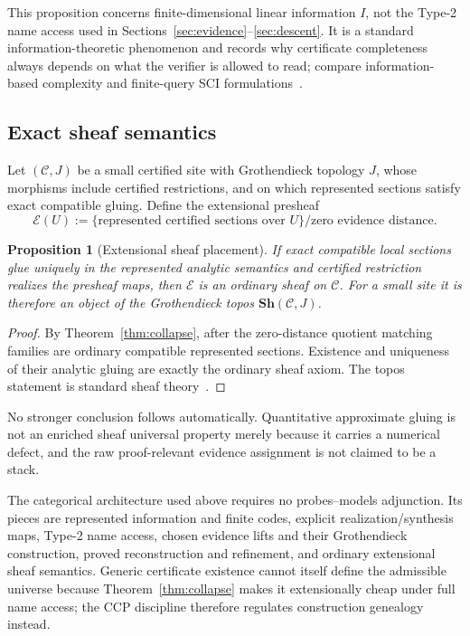 \documentclass[11pt]{article}
\newtheorem{proposition}[theorem]{Proposition}
\theoremstyle{definition}
\begin{document}
This proposition concerns finite-dimensional linear information $I$, not the Type-2 name
access used in Sections~\ref{sec:evidence}--\ref{sec:descent}.  It is a standard
information-theoretic phenomenon and records why
certificate completeness always depends on what the verifier is allowed to read; compare
information-based complexity and finite-query SCI formulations~\cite{TWW,ColbrookHansen,Sorg2026}.

\subsection{Exact sheaf semantics}

Let $(\mathcal C,J)$ be a small certified site with Grothendieck topology $J$, whose
morphisms include certified restrictions, and on which represented sections satisfy exact
compatible gluing.  Define the extensional presheaf
\[
 \mathcal E(U):=\{\text{represented certified sections over }U\}/\text{zero evidence distance}.
\]

\begin{proposition}[Extensional sheaf placement]\label{prop:sheaf}
If exact compatible local sections glue uniquely in the represented analytic semantics and
certified restriction realizes the presheaf maps, then $\mathcal E$ is an ordinary sheaf
on $\mathcal C$.  For a small site it is therefore an object of the Grothendieck topos
$\mathbf{Sh}(\mathcal C,J)$.
\end{proposition}

\begin{proof}
By Theorem~\ref{thm:collapse}, after the zero-distance quotient matching families are
ordinary compatible represented sections.  Existence and uniqueness of their analytic gluing are exactly the ordinary
sheaf axiom.  The topos statement is standard sheaf theory~\cite{Johnstone,FourmanScott}.
\end{proof}

No stronger conclusion follows automatically.  Quantitative approximate gluing is not an
enriched sheaf universal property merely because it carries a numerical defect, and the
raw proof-relevant evidence assignment is not claimed to be a stack.

The categorical architecture used above requires no probes--models adjunction.  Its pieces
are represented information and finite codes, explicit realization/synthesis maps, Type-2
name access, chosen evidence lifts and their Grothendieck construction, proved
reconstruction and refinement, and ordinary extensional sheaf semantics.  Generic
certificate existence cannot itself define the admissible universe because
Theorem~\ref{thm:collapse} makes it extensionally cheap under full name access; the CCP
discipline therefore regulates construction genealogy instead.
\end{document}
